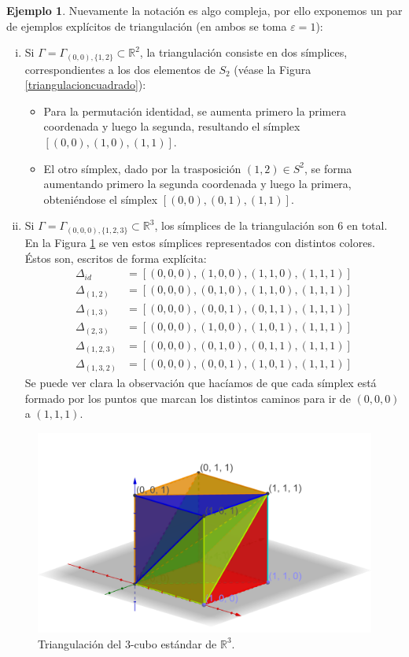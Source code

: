 \documentclass[12pt,a4paper,twoside]{article} %
\theoremstyle{plain}
\theoremstyle{definition}
\newtheorem{ejemplo}{Ejemplo}[subsection]
\newcommand{\R}{\mathbb{R}}
\begin{document}
\begin{ejemplo}
Nuevamente la notación es algo compleja, por ello exponemos un par de ejemplos explícitos de triangulación (en ambos se toma $\varepsilon=1$):
\begin{enumerate}[(i)]
\item Si $\Gamma = \Gamma_{(0,0),\{1,2\}} \subset \R^2$, la triangulación consiste en dos símplices, correspondientes a los dos elementos de $S_2$ (véase la Figura \ref{triangulacioncuadrado}):
\begin{itemize}
\item Para la permutación identidad, se aumenta primero la primera coordenada y luego la segunda, resultando el símplex $[(0,0),(1,0),(1,1)]$.
\item El otro símplex, dado por la trasposición $(1,2)\in S^2$, se forma aumentando primero la segunda coordenada y luego la primera, obteniéndose el símplex $[(0,0),(0,1),(1,1)]$.
\end{itemize}
\item Si $\Gamma = \Gamma_{(0,0,0),\{1,2,3\}} \subset \R^3$, los símplices de la triangulación son 6 en total. En la Figura \ref{triangulacioncubo} se ven estos símplices representados con distintos colores. Éstos son, escritos de forma explícita:
\begin{align*}
\Delta_{id}      &= [(0,0,0),(1,0,0),(1,1,0),(1,1,1)] \\
\Delta_{(1,2)}   &= [(0,0,0),(0,1,0),(1,1,0),(1,1,1)] \\
\Delta_{(1,3)}   &= [(0,0,0),(0,0,1),(0,1,1),(1,1,1)] \\
\Delta_{(2,3)}   &= [(0,0,0),(1,0,0),(1,0,1),(1,1,1)] \\
\Delta_{(1,2,3)} &= [(0,0,0),(0,1,0),(0,1,1),(1,1,1)] \\
\Delta_{(1,3,2)} &= [(0,0,0),(0,0,1),(1,0,1),(1,1,1)]
\end{align*}
Se puede ver clara la observación que hacíamos de que cada símplex está formado por los puntos que marcan los distintos caminos para ir de $(0,0,0)$ a $(1,1,1)$.
\end{enumerate}
\end{ejemplo}

\begin{figure}[h!]
\centering
\includegraphics[scale=0.3]{img/triangulacioncubo.png}
\caption{Triangulación del $3$-cubo estándar de $\R^3$.}
\label{triangulacioncubo}
\end{figure}
\end{document}
